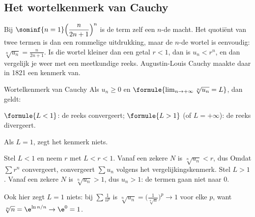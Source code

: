 \subsection{Het wortelkenmerk van Cauchy}

Bij $\sominf{n=1} \Bigl(\dfrac{n}{2n+1}\Bigr)^n$ is de term zelf een $n$-de macht. Het quotiënt van twee termen is dan een rommelige uitdrukking, maar de $n$-de wortel is eenvoudig: $\sqrt[n]{u_n} = \tfrac{n}{2n+1}$. Is die wortel kleiner dan een getal $r < 1$, dan is $u_n < r^n$, en dan vergelijk je weer met een meetkundige reeks. Augustin-Louis Cauchy maakte daar in 1821 een kenmerk van.

\begin{theorie}
\begin{stelling}{Wortelkenmerk van Cauchy}
Als $u_n \geqslant 0$ en \quad $\formule{\lim_{n\to+\infty} \sqrt[n]{u_n} = L}$, \quad dan geldt:

\vspace{1mm}
\qquad $\formule{L < 1}$: de reeks convergeert; \qquad $\formule{L > 1}$ (of $L = +\infty$): de reeks divergeert.

\vspace{1mm}
Als $L = 1$, zegt het kenmerk niets.
\end{stelling}

\begin{bewijs}
Stel $L < 1$ en neem $r$ met $L < r < 1$. Vanaf een zekere $N$ is $\sqrt[n]{u_n} < r$, dus
Omdat $\sum r^n$ convergeert, convergeert $\sum u_n$ volgens het vergelijkingskenmerk. Stel $L > 1$. Vanaf een zekere $N$ is $\sqrt[n]{u_n} > 1$, dus $u_n > 1$: de termen gaan niet naar 0.
\end{bewijs}
\end{theorie}

Ook hier zegt $L = 1$ niets: bij $\sum \tfrac1{n^p}$ is $\sqrt[n]{u_n} = \bigl(\tfrac{1}{\sqrt[n]{n}}\bigr)^p \to 1$ voor elke $p$, want $\sqrt[n]{n} = \e^{\ln n / n} \to \e^0 = 1$.


